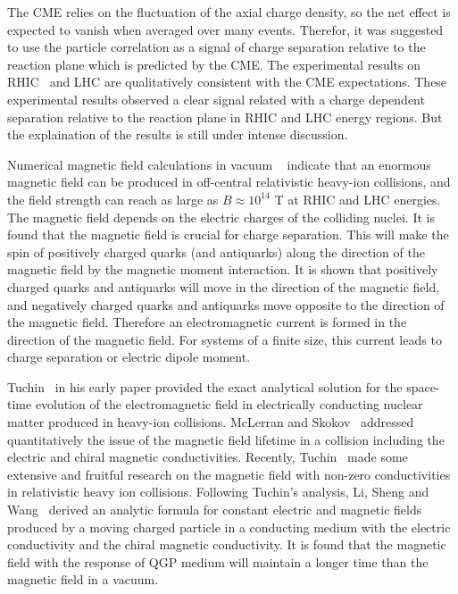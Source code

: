 \documentclass[twocolumn,showpacs,preprintnumbers,amsmath,amssymb]{revtex4}
\begin{document}
The CME relies on the fluctuation of the axial charge density, so the net effect is expected to vanish when averaged over many events. Therefor, it was suggested to use the particle correlation as a signal of charge separation relative to the reaction plane which is predicted by the CME. The experimental results on RHIC~\cite{lab8, lab9,lab10} and LHC \cite{lab11} are qualitatively consistent with the CME expectations. These experimental results observed  a clear signal related with a charge dependent separation relative to the reaction plane in RHIC and LHC energy regions. But the explaination of the results is still under intense  discussion.

Numerical magnetic field calculations in vacuum ~\cite{lab12,lab13,lab14,lab15,lab16}
indicate that an enormous magnetic field can be produced in off-central relativistic heavy-ion collisions, and the field strength can reach as large as $B\approx 10^{14}$ T
at RHIC and LHC energies. The magnetic field depends on the electric charges of the colliding nuclei.
It is found that the magnetic field is crucial for charge separation. This will make the spin of positively charged quarks (and antiquarks) along the
direction of the magnetic field by the magnetic moment interaction. It is shown that positively charged quarks and antiquarks will move in the
direction of the magnetic field, and negatively charged quarks and antiquarks move opposite to the direction of the magnetic field. Therefore an electromagnetic current is formed
in the direction of the magnetic field. For systems of a finite size, this current leads to charge separation or electric dipole moment.

Tuchin~\cite{lab17,lab18} in his early paper provided the exact
analytical solution for the space-time evolution of the electromagnetic field in electrically conducting nuclear matter produced in heavy-ion collisions.
McLerran and Skokov~\cite{lab19} addressed quantitatively the issue of the magnetic field lifetime in a collision including the electric and chiral
magnetic conductivities. Recently, Tuchin~\cite{lab20,lab21} made some extensive and fruitful research on the magnetic field with non-zero conductivities in relativistic heavy ion collisions.
Following Tuchin's analysis, Li, Sheng and Wang~\cite{lab22} derived an analytic formula for constant electric and magnetic fields
produced by a moving charged particle in a conducting medium with the electric conductivity  and the chiral magnetic conductivity. It is found that the
magnetic field with the response of QGP medium will maintain a longer time than the magnetic field in a vacuum.
\end{document}
